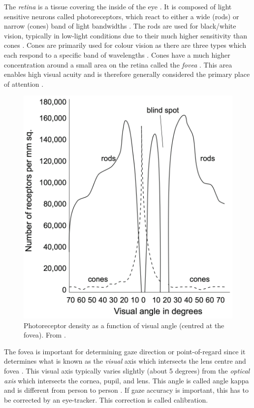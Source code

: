 




The \emph{retina} is a tissue covering the inside of the eye \parencite[18]{methodology}. It is composed of light sensitive neurons called photoreceptors, which react to either a wide (rods) or narrow (cones) band of light bandwidths \parencite[18]{methodology}. The rods are used for black/white vision, typically in low-light conditions due to their much higher sensitivity than cones \parencite[18]{methodology}. Cones are primarily used for colour vision as there are three types which each respond to a specific band of wavelengths \parencite[18]{methodology}. Cones have a much higher concentration around a small area on the retina called the \emph{fovea} \parencite[30]{methodology}. This area enables high visual acuity and is therefore generally considered the primary place of attention \parencite[30]{methodology}. %

\begin{figure}
    \centering
    \includegraphics[width=0.6\linewidth]{figures/retina-density.png}
    \caption{Photoreceptor density as a function of visual angle (centred at the fovea). From \parencite{methodology}.}
    \label{fig:my_label}
\end{figure}

The fovea is important for determining gaze direction or point-of-regard since it determines what is known as the \emph{visual} axis which intersects the lens centre and fovea \parencite[19]{methodology}. This visual axis typically varies slightly (about 5 degrees) from the \emph{optical axis} which intersects the cornea, pupil, and lens. This angle is called angle kappa and is different from person to person \parencite[30]{methodology}. If gaze accuracy is important, this has to be corrected by an eye-tracker. This correction is called calibration.

